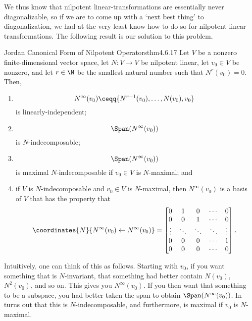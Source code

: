 We thus know that nilpotent linear-transformations are essentially never diagonalizable, so if we are to come up with a `next best thing' to diagonalization, we had at the very least know how to do so for nilpotent linear-transformations.  The following result is our solution to this problem.
\begin{thm}{Jordan Canonical Form of Nilpotent Operators}{thm4.6.17}
	Let $V$ be a nonzero finite-dimensional vector space, let $N\colon V\rightarrow V$ be nilpotent linear, let $v_0\in V$ be nonzero, and let $r\in \N$ be the smallest natural number such that $N^r(v_0)=0$.  Then,
	\begin{enumerate}
		\item \label{thm4.6.17(i)}
		\begin{equation}
			N^{\infty}(v_0)\ceqq \{ N^{r-1}(v_0),\ldots ,N(v_0),v_0\}
		\end{equation}
		is linearly-independent;
		\item \label{thm4.6.17(ii)}
		\begin{equation}
			\Span (N^{\infty}(v_0))
		\end{equation}
		is $N$-indecomposable;
		\item \label{thm4.6.17(iii)}
		\begin{equation}
			\Span (N^{\infty}(v_0))
		\end{equation}
		is maximal $N$-indecomposable if $v_0\in V$ is $N$-maximal; and
		\item \label{thm4.6.17(iv)}if $V$ is $N$-indecomposable and $v_0\in V$ is $N$-maximal, then $N^{\infty}(v_0)$ is a basis of $V$ that has the property that
		\begin{equation}\label{eqn4.6.17}
			\coordinates{N}{N^{\infty}(v_0)\leftarrow N^{\infty}(v_0)}=\begin{bmatrix}0 & 1 & 0 & \cdots & 0 \\ 0 & 0 & 1 & \cdots & 0 \\ \vdots &\ddots & \ddots & \ddots & \vdots \\ 0 & 0 & 0 & \cdots & 1 \\ 0 & 0 & 0 & \cdots & 0\end{bmatrix}.
		\end{equation}
	\end{enumerate}
	\begin{rmk}
		Intuitively, one can think of this as follows.  Starting with $v_0$, if you want something that is $N$-invariant, that something had better contain $N(v_0)$, $N^2(v_0)$, and so on.  This gives you $N^{\infty}(v_0)$.  If you then want that something to be a subspace, you had better taken the span to obtain $\Span (N^{\infty}(v_0))$.  In turns out that this is $N$-indecomposable, and furthermore, is maximal if $v_0$ is $N$-maximal.

\end{rmk}
\end{thm}
